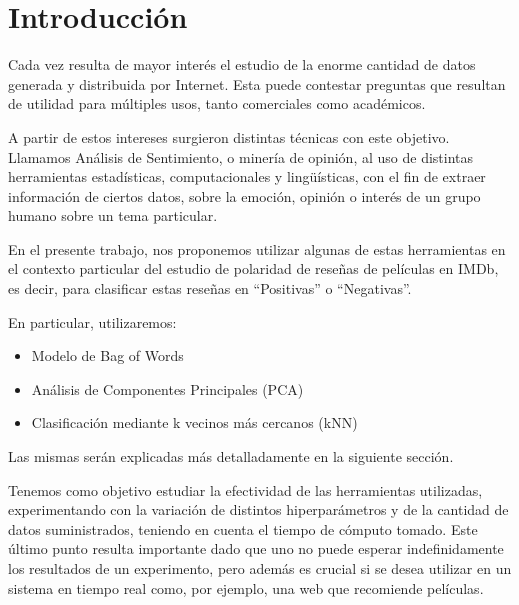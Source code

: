 \section{Introducción}

Cada vez resulta de mayor interés el estudio de la enorme cantidad de datos
generada y distribuida por Internet. Esta puede contestar preguntas que
resultan de utilidad para múltiples usos, tanto comerciales como académicos.

A partir de estos intereses surgieron distintas técnicas con este
objetivo. Llamamos Análisis de Sentimiento, o minería de opinión, al uso de
distintas herramientas estadísticas, computacionales y lingüísticas,
con el fin de extraer información de ciertos datos, sobre la emoción, opinión o
interés de un grupo humano sobre un tema particular.

En el presente trabajo, nos proponemos utilizar algunas de estas herramientas
en el contexto particular del estudio de polaridad de reseñas de películas
en IMDb\cite{IMDB}, es decir, para clasificar estas reseñas en ``Positivas'' o ``Negativas''.

En particular, utilizaremos:
\begin{itemize}
    \item Modelo de Bag of Words
    \item Análisis de Componentes Principales (PCA)
    \item Clasificación mediante k vecinos más cercanos (kNN)
\end{itemize}
Las mismas serán explicadas más detalladamente en la siguiente sección.

Tenemos como objetivo estudiar la efectividad de las herramientas utilizadas,
experimentando con la variación de distintos hiperparámetros y de la cantidad de datos
suministrados, teniendo en cuenta el tiempo de cómputo tomado.
Este último punto resulta importante dado que uno no puede esperar indefinidamente
los resultados de un experimento, pero además es crucial si se desea
utilizar en un sistema en tiempo real como, por ejemplo, una web que recomiende películas.



